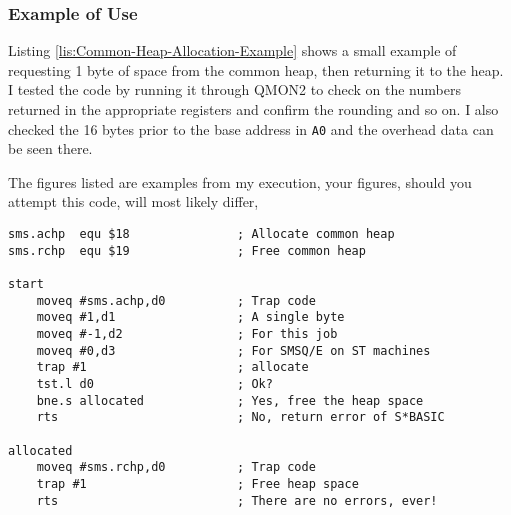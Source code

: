 \subsubsection{Example of Use}

Listing \ref{lis:Common-Heap-Allocation-Example} shows a small example
of requesting 1 byte of space from the common heap, then returning
it to the heap. I tested the code by running it through QMON2 to check
on the numbers returned in the appropriate registers and confirm the
rounding and so on. I also checked the 16 bytes prior to the base
address in \texttt{A0} and the overhead data can be seen there.

The figures listed are examples from my execution, your figures, should
you attempt this code, will most likely differ,

\begin{lstlisting}[caption={Common Heap Allocation Example},label={lis:Common-Heap-Allocation-Example}]
sms.achp  equ $18               ; Allocate common heap
sms.rchp  equ $19               ; Free common heap 

start
    moveq #sms.achp,d0          ; Trap code
    moveq #1,d1                 ; A single byte
    moveq #-1,d2                ; For this job 
    moveq #0,d3                 ; For SMSQ/E on ST machines
    trap #1                     ; allocate
    tst.l d0                    ; Ok?
    bne.s allocated             ; Yes, free the heap space
    rts                         ; No, return error of S*BASIC

allocated
    moveq #sms.rchp,d0          ; Trap code
    trap #1                     ; Free heap space
    rts                         ; There are no errors, ever!

\end{lstlisting}

